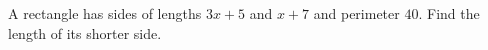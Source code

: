 A rectangle has sides of lengths $3x+5$ and $x+7$ and perimeter $40$. Find the length of its shorter side.
